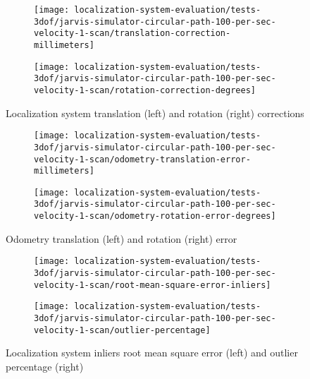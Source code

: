 \begin{figure}[ht]
	\centering
	\begin{subfigure}[h]{0.47\textwidth}
		\centering
		\texttt{[image: localization-system-evaluation/tests-3dof/jarvis-simulator-circular-path-100-per-sec-velocity-1-scan/translation-correction-millimeters]}
	\end{subfigure}
	\begin{subfigure}[h]{0.47\textwidth}
		\centering
		\texttt{[image: localization-system-evaluation/tests-3dof/jarvis-simulator-circular-path-100-per-sec-velocity-1-scan/rotation-correction-degrees]}
	\end{subfigure}
	\caption{Localization system translation (left) and rotation (right) corrections}
	\label{fig:localization-system-evaluation_jarvis-simulator-circular-path-100-per-sec-velocity-1-scan_translation-rotation-corrections}
\end{figure}

\begin{figure}[ht]
	\centering
	\begin{subfigure}[h]{0.47\textwidth}
		\centering
		\texttt{[image: localization-system-evaluation/tests-3dof/jarvis-simulator-circular-path-100-per-sec-velocity-1-scan/odometry-translation-error-millimeters]}
	\end{subfigure}
	\begin{subfigure}[h]{0.47\textwidth}
		\centering
		\texttt{[image: localization-system-evaluation/tests-3dof/jarvis-simulator-circular-path-100-per-sec-velocity-1-scan/odometry-rotation-error-degrees]}
	\end{subfigure}
	\caption{Odometry translation (left) and rotation (right) error}
	\label{fig:localization-system-evaluation_jarvis-simulator-circular-path-100-per-sec-velocity-1-scan_odometry-translation-rotation-errors}
\end{figure}

\begin{figure}[ht]
	\centering
	\begin{subfigure}[h]{0.47\textwidth}
		\centering
		\texttt{[image: localization-system-evaluation/tests-3dof/jarvis-simulator-circular-path-100-per-sec-velocity-1-scan/root-mean-square-error-inliers]}
	\end{subfigure}
	\begin{subfigure}[h]{0.47\textwidth}
		\centering
		\texttt{[image: localization-system-evaluation/tests-3dof/jarvis-simulator-circular-path-100-per-sec-velocity-1-scan/outlier-percentage]}
	\end{subfigure}
	\caption{Localization system inliers root mean square error (left) and outlier percentage (right)}
	\label{fig:localization-system-evaluation_jarvis-simulator-circular-path-100-per-sec-velocity-1-scan_inliers-rmse-outliers-percentage}
\end{figure}

